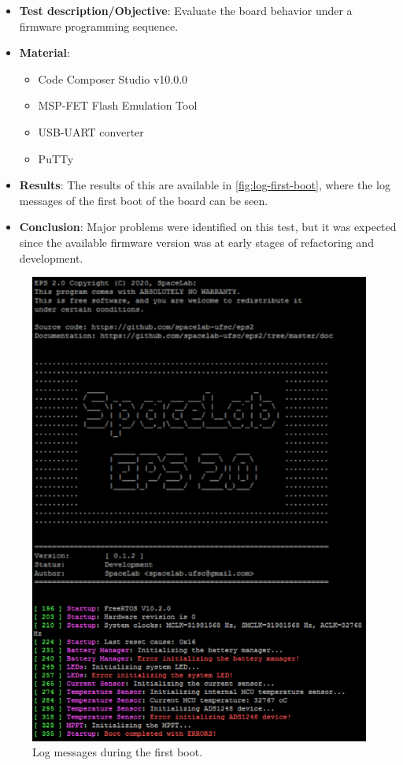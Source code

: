 \begin{itemize}
    \item \textbf{Test description/Objective}: Evaluate the board behavior under a firmware programming sequence.
    \item \textbf{Material}:
        \begin{itemize}
            \item Code Composer Studio v10.0.0
            \item MSP-FET Flash Emulation Tool
            \item USB-UART converter
            \item PuTTy
        \end{itemize}
    \item \textbf{Results}: The results of this are available in \autoref{fig:log-first-boot}, where the log messages of the first boot of the board can be seen.
    \item \textbf{Conclusion}: Major problems were identified on this test, but it was expected since the available firmware version was at early stages of refactoring and development.
\end{itemize}

\begin{figure}[!ht]
    \begin{center}
        \includegraphics[width=0.6\columnwidth]{figures/v01/log-first-boot.png}
        \caption{Log messages during the first boot.}
        \label{fig:log-first-boot}
    \end{center}
\end{figure}

